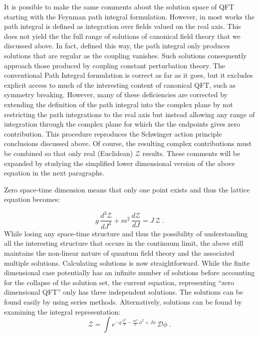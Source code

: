 \documentclass[12pt]{article}
\begin{document}
 
It is possible to make the same comments about the solution space of QFT
starting with the Feynman path integral formulation. However, in most works
the path integral is defined as integration over fields valued on the real
axis. This does not yield the the full range of solutions of canonical field
theory that we discussed above. In fact, defined this way, the path integral
only produces solutions that are regular as the coupling vanishes. Such solutions
consequently approach those produced by coupling constant perturbation theory. The
conventional Path Integral formulation is correct as far as it goes, but it
excludes explicit access to much of the interesting content of canonical QFT,
such as symmetry breaking. However, many of these deficiencies are
corrected by extending the definition of the path integral into the complex
plane by not restricting the path integrations to the real axis but instead
allowing any range of integration through the complex plane for which the the
endpoints gives zero contribution. This procedure reproduces the Schwinger
action principle conclusions discussed above. Of course, the resulting complex
contributions must be combined so that only real (Euclidean) $\mathcal{Z}$
results. These comments will be expanded by studying the simplified lower
dimensional version of the above equation in the next paragraphs.

Zero space-time dimension means that only one point exists and thus the
lattice equation becomes:

  \begin{equation*}
    g\, \frac{d^3 \mathcal{Z}}{d J^3} + m^2\, \frac{d \mathcal{Z}}{d J} = J\, \mathcal{Z} \; .
  \end{equation*}
  While losing any space-time structure and thus the possibility of
  understanding all the interesting structure that occurs in the continuum
  limit, the above still maintains the non-linear nature of quantum field
  theory and the associated multiple solutions.  Calculating solutions is now
  straightforward.  While the finite dimensional case potentially has an
  infinite number of solutions before accounting for the collapse of the
  solution set, the current equation, representing ``zero dimensional QFT''
  only has three independent solutions. The solutions can be found easily by
  using series methods. Alternatively, solutions can be found by examining the
  integral representation:
    \begin{equation*}
      \mathcal{Z} = \int e^{-g\, \frac{\phi^4}{4} -
        \frac{m^2}{2}\,\phi^{2} + J\phi}\, \mathcal{D}\phi \; .
    \end{equation*}
\end{document}
